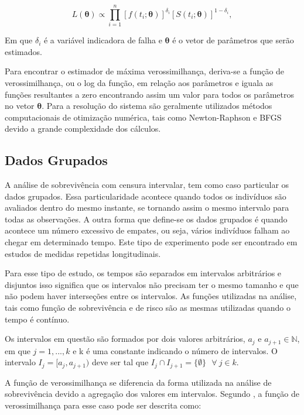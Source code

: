 \documentclass[a4paper,12pt]{article}
\begin{document}
\begin{equation} \label{eq:maxv1}
  L(\boldsymbol{\theta}) \propto \prod_{i=1}^n \left[f(t_i;\boldsymbol{\theta})\right]^{\delta_i} \left[S(t_i;\boldsymbol{\theta})\right]^{1-\delta_i},
\end{equation}

Em que $\delta_i$ é a variável indicadora de falha e $\boldsymbol{\theta}$ é o vetor de parâmetros que serão estimados.

Para encontrar o estimador de máxima verossimilhança, deriva-se a função de verossimilhança, ou o log da função, em relação aos parâmetros e iguala as funções resultantes a zero encontrando assim um valor para todos os parâmetros no vetor $\boldsymbol{\theta}$. Para a resolução do sistema são geralmente utilizados métodos computacionais de otimização numérica, tais como Newton-Raphson e BFGS devido a grande complexidade dos cálculos. 


\subsection{Dados Grupados}

A análise de sobrevivência com censura intervalar, tem como caso particular os dados grupados. Essa particularidade acontece quando todos os indivíduos são avaliados dentro do mesmo instante, se tornando assim o mesmo intervalo para todas as observações. A outra forma que define-se os dados grupados é quando acontece um número excessivo de empates, ou seja, vários indivíduos falham ao chegar em determinado tempo. Este tipo de experimento pode ser encontrado em estudos de medidas repetidas longitudinais.

Para esse tipo de estudo, os tempos são separados em intervalos arbitrários e disjuntos isso significa que os intervalos não precisam ter o mesmo tamanho e que não podem haver interseções entre os intervalos. As funções utilizadas na análise, tais como função de sobrevivência e de risco são as mesmas utilizadas quando o tempo é contínuo.

Os intervalos em questão são formados por dois valores arbitrários, $a_j$ e $a_{j+1} \in \mathbb{N}$, em que $j = 1, ..., k$ e k é uma constante indicando o número de intervalos. O intervalo $I_j = [a_j, a_{j+1})$ deve ser tal que $I_j\cap I_{j+1} = \{\emptyset\} \ \ \ \forall \ j \in k$.

A função de verossimilhança se diferencia da forma utilizada na análise de sobrevivência devido a agregação dos valores em intervalos. Segundo \cite{elisangela}, a função de verossimilhança para esse caso pode ser descrita como:
\end{document}
